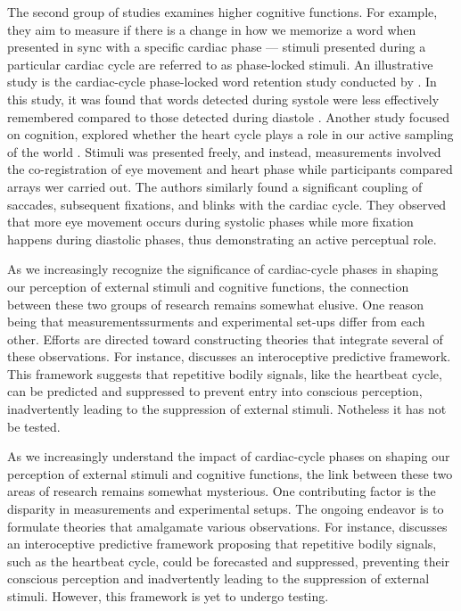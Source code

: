 \documentclass[12pt,oneside,openright]{report}
\begin{document}
The second group of studies examines higher cognitive functions. For example, they aim to measure if there is a change in how we memorize a word when presented in sync with a specific cardiac phase — stimuli presented during a particular cardiac cycle are referred to as phase-locked stimuli. An illustrative study is the cardiac-cycle phase-locked word retention study conducted by \Cite{Garfinkel2013-st}. In this study, it was found that words detected during systole were less effectively remembered compared to those detected during diastole \parencite{Garfinkel2013-st}. Another study focused on cognition, explored whether the heart cycle plays a role in our active sampling of the world \parencite{GalvezPol2018ActiveSI}. Stimuli was presented freely, and instead, measurements involved the co-registration of eye movement and heart phase while participants compared arrays wer carried out. The authors similarly found a significant coupling of saccades, subsequent fixations, and blinks with the cardiac cycle. They observed that more eye movement occurs during systolic phases while more fixation happens during diastolic phases, thus demonstrating an active perceptual role.

As we increasingly recognize the significance of cardiac-cycle phases in shaping our perception of external stimuli and cognitive functions, the connection between these two groups of research remains somewhat elusive. One reason being that measurementssurments and experimental set-ups differ from each other. Efforts are directed toward constructing theories that integrate several of these observations. For instance, \parencite{AL2021118247} discusses an interoceptive predictive framework. This framework suggests that repetitive bodily signals, like the heartbeat cycle, can be predicted and suppressed to prevent entry into conscious perception, inadvertently leading to the suppression of external stimuli. Notheless it has not be tested. 

As we increasingly understand the impact of cardiac-cycle phases on shaping our perception of external stimuli and cognitive functions, the link between these two areas of research remains somewhat mysterious. One contributing factor is the disparity in measurements and experimental setups. The ongoing endeavor is to formulate theories that amalgamate various observations. For instance, \parencite{AL2021118247} discusses an interoceptive predictive framework proposing that repetitive bodily signals, such as the heartbeat cycle, could be forecasted and suppressed, preventing their conscious perception and inadvertently leading to the suppression of external stimuli. However, this framework is yet to undergo testing.
\end{document}
